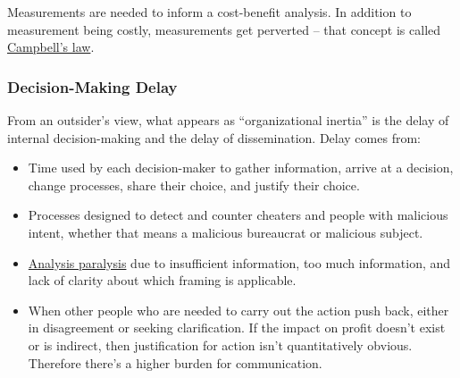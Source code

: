Measurements are needed to inform a cost-benefit analysis. In addition to measurement being costly, measurements get perverted -- that concept is called \href{https://en.wikipedia.org/wiki/Campbell\%27s_law}{Campbell's law}. 

\subsubsection*{Decision-Making Delay\label{sec:decision-delay}}

From an outsider's view, what appears as ``organizational inertia'' is the delay of internal decision-making and the delay of dissemination. 
Delay comes from:
\begin{itemize}
    \item Time used by each decision-maker to gather information, arrive at a decision, change processes, share their choice, and justify their choice. 
    \item Processes designed to detect and counter cheaters and people with malicious intent, whether that means a malicious bureaucrat or malicious subject. 
\item \href{https://en.wikipedia.org/wiki/Analysis_paralysis}{Analysis paralysis} 
\iftoggle{WPinmargin}{\marginpar{$>$Wikipedia: Analysis paralysis}}{}
due to insufficient information, too much information, and lack of clarity about which framing is applicable.
\item When other people who are needed to carry out the action push back, either in disagreement or seeking clarification. If the impact on profit doesn't exist or is indirect, then justification for action isn't quantitatively obvious. Therefore there's a higher burden for communication.
\end{itemize}




